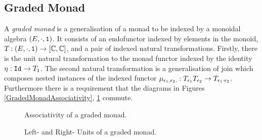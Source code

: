 \subsection{Graded Monad}


A \textit{graded monad} is a generalisation of a monad to be indexed by a monoidal algebra $(E,\cdot, \texttt{1})$. It consists of an endofunctor indexed by elements in the monoid, $T_{}{}: (E, \cdot, \texttt{1})  \rightarrow [\mathbb{C}, \mathbb{C}]$, and a pair of indexed natural transformations. Firstly, there is the unit natural transformation to the monad functor indexed by the identity $\eta_{}: \texttt{Id}_{} \rightarrow T_{\texttt{1}}{}$. The second natural transformation is a generalisation of join which composes nested instances of the indexed functor $\mu_{\epsilon_1, \epsilon_2, }: T_{\epsilon_1}{T_{\epsilon_2}{}} \rightarrow T_{\epsilon_1 \cdot \epsilon_2}{}$. Furthermore there is a requirement that the diagrams in Figures \ref{GradedMonadAssociativity}, \ref{GradedMonadUnits} commute.


\begin{figure}
        \centering
        \begin{minipage}{0.45\linewidth}
            \centering
            \begin{framed}
            \end{framed}
            \caption{Associativity of a graded monad.}
            \label{GradedMonadAssociativity}
        \end{minipage}\hfill
        \begin{minipage}{0.45\linewidth}
            \centering
            \begin{framed}
            \end{framed}
            \caption{Left- and Right- Units of a graded monad.}
            \label{GradedMonadUnits}
        \end{minipage}
\end{figure}


